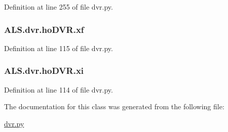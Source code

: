 Definition at line 255 of file dvr.\+py.

\hypertarget{class_a_l_s_1_1dvr_1_1ho_d_v_r_a726b39f43d5d05858ee97d6e905df1f2}{
\subsubsection[{xf}]{\setlength{\rightskip}{0pt plus 5cm}A\+L\+S.\+dvr.\+ho\+D\+V\+R.\+xf}}\label{class_a_l_s_1_1dvr_1_1ho_d_v_r_a726b39f43d5d05858ee97d6e905df1f2}


Definition at line 115 of file dvr.\+py.

\hypertarget{class_a_l_s_1_1dvr_1_1ho_d_v_r_a6fae504b43056a6b1175d53ff2fefb0a}{
\subsubsection[{xi}]{\setlength{\rightskip}{0pt plus 5cm}A\+L\+S.\+dvr.\+ho\+D\+V\+R.\+xi}}\label{class_a_l_s_1_1dvr_1_1ho_d_v_r_a6fae504b43056a6b1175d53ff2fefb0a}


Definition at line 114 of file dvr.\+py.



The documentation for this class was generated from the following file\+:\begin{DoxyCompactItemize}
\item 
\hyperlink{dvr_8py}{dvr.\+py}\end{DoxyCompactItemize}
